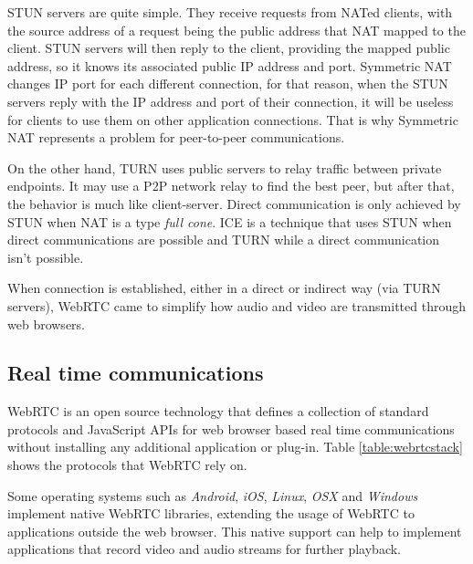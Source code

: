 \documentclass[conference,compsoc,a4paper]{IEEEtran}
\begin{document}
\gls{STUN} servers are quite simple. They receive requests from \gls{NAT}ed clients, with the source address of a request being the public address that \gls{NAT} mapped to the client. \gls{STUN} servers will then reply to the client, providing the mapped public address, so it knows its associated public \gls{IP} address and port. Symmetric \gls{NAT} changes \gls{IP} port for each different connection, for that reason, when the \gls{STUN} servers reply with the \gls{IP} address and port of their connection, it will be useless for clients to use them on other application connections. That is why Symmetric \gls{NAT} represents a problem for peer-to-peer communications.   

On the other hand, \gls{TURN} uses public servers to relay traffic between private endpoints.
It may use a \gls{P2P} network relay to find the best peer, but after that, the behavior is much like client-server. Direct communication is only achieved by \gls{STUN} when \gls{NAT} is a type \emph{full cone}. \gls{ICE} is a technique that uses \gls{STUN} when direct communications are possible and \gls{TURN} while a direct communication isn't possible.

When connection is established, either in a direct or indirect way (via \gls{TURN} servers), \gls{WebRTC} came to simplify how audio and video are transmitted through web browsers.

\subsection{Real time communications}\label{rtc}

\gls{WebRTC} is an open source technology that defines a collection of standard protocols and JavaScript \gls{API}s for web browser based real time communications without installing any additional application or plug-in. Table \ref{table:webrtcstack} shows the protocols that \gls{WebRTC} rely on.

Some operating systems such as \emph{Android}, \emph{iOS}, \emph{Linux}, \emph{OSX} and \emph{Windows} implement native \gls{WebRTC} libraries, extending the usage of \gls{WebRTC} to applications outside the web browser. This native support can help to implement applications that record video and audio streams for further playback.
\end{document}
